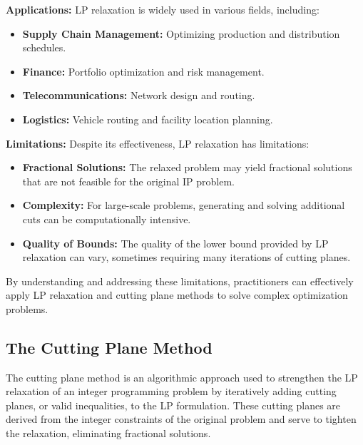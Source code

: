 \documentclass[12pt]{book} %
\begin{document}
\textbf{Applications:}
LP relaxation is widely used in various fields, including:

\begin{itemize}
    \item \textbf{Supply Chain Management:} Optimizing production and distribution schedules.
    \item \textbf{Finance:} Portfolio optimization and risk management.
    \item \textbf{Telecommunications:} Network design and routing.
    \item \textbf{Logistics:} Vehicle routing and facility location planning.
\end{itemize}

\textbf{Limitations:}
Despite its effectiveness, LP relaxation has limitations:

\begin{itemize}
    \item \textbf{Fractional Solutions:} The relaxed problem may yield fractional solutions that are not feasible for the original IP problem.
    \item \textbf{Complexity:} For large-scale problems, generating and solving additional cuts can be computationally intensive.
    \item \textbf{Quality of Bounds:} The quality of the lower bound provided by LP relaxation can vary, sometimes requiring many iterations of cutting planes.
\end{itemize}

By understanding and addressing these limitations, practitioners can effectively apply LP relaxation and cutting plane methods to solve complex optimization problems.

\subsection{The Cutting Plane Method}

The cutting plane method is an algorithmic approach used to strengthen the LP relaxation of an integer programming problem by iteratively adding cutting planes, or valid inequalities, to the LP formulation. These cutting planes are derived from the integer constraints of the original problem and serve to tighten the relaxation, eliminating fractional solutions.
\end{document}
